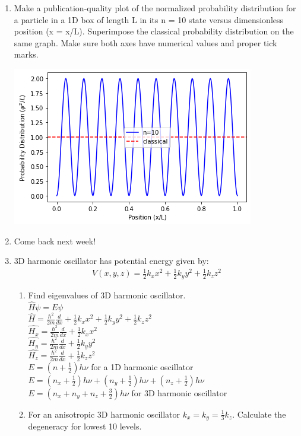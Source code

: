 \documentclass{article}
\begin{document}
\begin{enumerate}
\begin{enumerate}
    \end{enumerate}
\item Make a publication-quality plot of the normalized probability distribution for a particle
in a 1D box of length L in its n = 10 state versus dimensionless position (x = x/L).
Superimpose the classical probability distribution on the same graph. Make sure both axes
have numerical values and proper tick marks.
    \\\centerline{\includegraphics[scale=0.7]{download.png}}
\item Come back next week!
\item 3D harmonic oscillator has potential energy given by: 
    \begin{gather*} V(x,y,z)=\frac{1}{2}k_xx^2+\frac{1}{2}k_yy^2+\frac{1}{2}k_zz^2
    \end{gather*}
    \begin{enumerate}
    \item Find eigenvalues of 3D harmonic oscillator.
    \\ $\hat{H}\psi=E\psi$
    \\ $\hat{H}= \frac{\hbar^2}{2m}\frac{d}{dx}+\frac{1}{2}k_xx^2+\frac{1}{2}k_yy^2+\frac{1}{2}k_zz^2$
    \\ $\hat{H_x}= \frac{\hbar^2}{2m}\frac{d}{dx}+\frac{1}{2}k_xx^2$
    \\ $\hat{H_y}= \frac{\hbar^2}{2m}\frac{d}{dx}+\frac{1}{2}k_yy^2$
    \\ $\hat{H_z}= \frac{\hbar^2}{2m}\frac{d}{dx}+\frac{1}{2}k_zz^2$
    \\ $E=(n+\frac{1}{2})h\nu$ for a 1D harmonic oscillator
    \\ $E=(n_x+\frac{1}{2})h\nu+(n_y+\frac{1}{2})h\nu+(n_z+\frac{1}{2})h\nu$
    \\ $E=(n_x+n_y+n_z+\frac{3}{2})h\nu$ for 3D harmonic oscillator
    \item For an anisotropic 3D harmonic oscillator $k_x=k_y=\frac{1}{3}k_z$. Calculate the degeneracy for lowest 10 levels.

\end{enumerate}
\end{enumerate}
\end{document}
